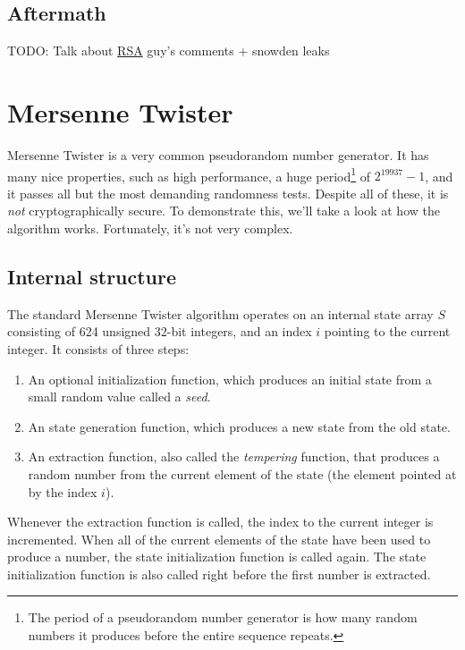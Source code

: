 \documentclass[11pt,ebook,table,dvipsnames]{memoir}
\begin{document}
\subsection{Aftermath}
\label{sec-2-10-5-4}

TODO: Talk about \hyperref[RSA]{RSA} guy's comments + snowden leaks
\section{Mersenne Twister}
\label{sec-2-10-6}

Mersenne Twister is a very common pseudorandom number generator. It
has many nice properties, such as high performance, a huge
period\footnote{The period of a pseudorandom number generator is how many
random numbers it produces before the entire sequence repeats.} of
$2^{19937} - 1$, and it passes all but the most demanding randomness
tests. Despite all of these, it is \emph{not} cryptographically secure. To
demonstrate this, we'll take a look at how the algorithm works.
Fortunately, it's not very complex.

\subsection{Internal structure}
\label{sec-2-10-6-1}

The standard Mersenne Twister algorithm operates on an internal state
array $S$ consisting of 624 unsigned 32-bit integers, and an index $i$
pointing to the current integer. It consists of three steps:

\begin{enumerate}
\item An optional initialization function, which produces an initial
state from a small random value called a \emph{seed}.
\item An state generation function, which produces a new state from the
old state.
\item An extraction function, also called the \emph{tempering} function, that
produces a random number from the current element of the state (the
element pointed at by the index $i$).
\end{enumerate}

Whenever the extraction function is called, the index to the current
integer is incremented. When all of the current elements of the state
have been used to produce a number, the state initialization function
is called again. The state initialization function is also called
right before the first number is extracted.
\end{document}
